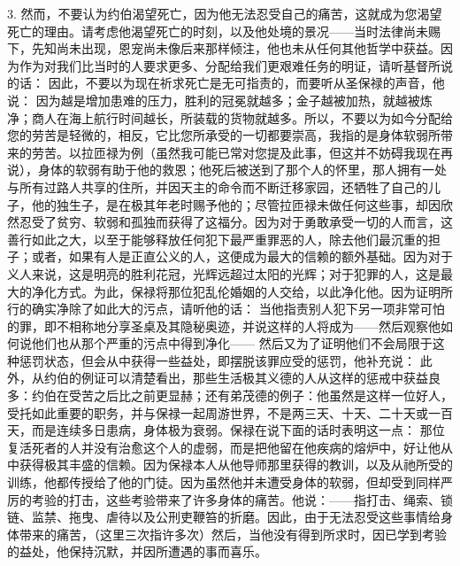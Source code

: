 3. 然而，不要认为约伯渴望死亡，因为他无法忍受自己的痛苦，这就成为您渴望死亡的理由。请考虑他渴望死亡的时刻，以及他处境的景况——当时法律尚未赐下，先知尚未出现，恩宠尚未像后来那样倾注，他也未从任何其他哲学中获益。因为作为对我们比当时的人要求更多、分配给我们更艰难任务的明证，请听基督所说的话： 因此，不要以为现在祈求死亡是无可指责的，而要听从圣保禄的声音，他说： 因为越是增加患难的压力，胜利的冠冕就越多；金子越被加热，就越被炼净；商人在海上航行时间越长，所装载的货物就越多。所以，不要以为如今分配给您的劳苦是轻微的，相反，它比您所承受的一切都要崇高，我指的是身体软弱所带来的劳苦。以拉匝禄为例（虽然我可能已常对您提及此事，但这并不妨碍我现在再说），身体的软弱有助于他的救恩；他死后被送到了那个人的怀里，那人拥有一处与所有过路人共享的住所，并因天主的命令而不断迁移家园，还牺牲了自己的儿子，他的独生子，是在极其年老时赐予他的；尽管拉匝禄未做任何这些事，却因欣然忍受了贫穷、软弱和孤独而获得了这福分。因为对于勇敢承受一切的人而言，这善行如此之大，以至于能够释放任何犯下最严重罪恶的人，除去他们最沉重的担子；或者，如果有人是正直公义的人，这便成为最大的信赖的额外基础。因为对于义人来说，这是明亮的胜利花冠，光辉远超过太阳的光辉；对于犯罪的人，这是最大的净化方式。为此，保禄将那位犯乱伦婚姻的人交给，以此净化他。因为证明所行的确实净除了如此大的污点，请听他的话： 当他指责别人犯下另一项非常可怕的罪，即不相称地分享圣桌及其隐秘奥迹，并说这样的人将成为——然后观察他如何说他们也从那个严重的污点中得到净化—— 然后又为了证明他们不会局限于这种惩罚状态，但会从中获得一些益处，即摆脱该罪应受的惩罚，他补充说： 此外，从约伯的例证可以清楚看出，那些生活极其义德的人从这样的惩戒中获益良多：约伯在受苦之后比之前更显赫；还有弟茂德的例子：他虽然是这样一位好人，受托如此重要的职务，并与保禄一起周游世界，不是两三天、十天、二十天或一百天，而是连续多日患病，身体极为衰弱。保禄在说下面的话时表明这一点： 那位复活死者的人并没有治愈这个人的虚弱，而是把他留在他疾病的熔炉中，好让他从中获得极其丰盛的信赖。因为保禄本人从他导师那里获得的教训，以及从祂所受的训练，他都传授给了他的门徒。因为虽然他并未遭受身体的软弱，但却受到同样严厉的考验的打击，这些考验带来了许多身体的痛苦。他说：——指打击、绳索、锁链、监禁、拖曳、虐待以及公刑吏鞭笞的折磨。因此，由于无法忍受这些事情给身体带来的痛苦，（这里三次指许多次）然后，当他没有得到所求时，因已学到考验的益处，他保持沉默，并因所遭遇的事而喜乐。\par

